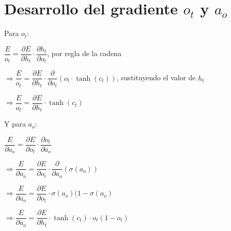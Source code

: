 \chapter{Desarrollo del gradiente \texorpdfstring{$o_t$}{ot} y \texorpdfstring{$a_o$}{ao}}
\label{ApA}

Para $o_t$:

$\dfrac{E}{o_t} = \dfrac{\partial E}{\partial h_t} \cdot \dfrac{\partial h_t}{\partial o_t}$, por regla de la cadena

$\Longrightarrow \dfrac{E}{o_t} = \dfrac{\partial E}{\partial h_t} \cdot \dfrac{\partial}{\partial o_t} (o_t \cdot \tanh(c_t))$, sustituyendo el valor de $h_t$

$\Longrightarrow \dfrac{E}{o_t} = \dfrac{\partial E}{\partial h_t} \cdot \tanh(c_t)$

Y para $a_o$:

$\dfrac{E}{\partial a_o} = \dfrac{\partial E}{\partial o_t} \cdot \dfrac{\partial o_t}{\partial a_o}$

$\Longrightarrow \dfrac{E}{\partial a_o} = \dfrac{\partial E}{\partial o_t} \cdot \dfrac{\partial}{\partial a_o} (\sigma (a_o))$

$\Longrightarrow \dfrac{E}{\partial a_o} = \dfrac{\partial E}{\partial o_t} \cdot \sigma (a_o)(1-\sigma(a_o)$

$\Longrightarrow \dfrac{E}{\partial a_o} = \dfrac{\partial E}{\partial h_t} \cdot \tanh(c_t) \cdot o_t(1-o_t)$ 